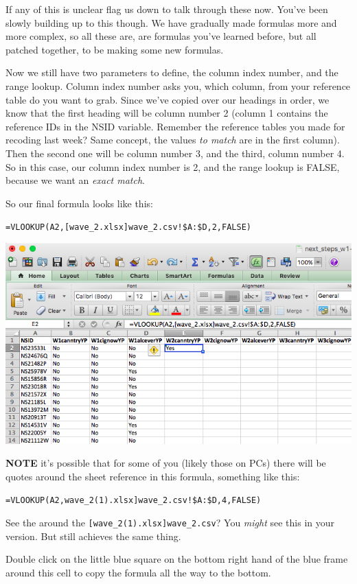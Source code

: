 \documentclass[
]{book}
\begin{document}
If any of this is unclear flag us down to talk through these now. You've been slowly building up to this though. We have gradually made formulas more and more complex, so all these are, are formulas you've learned before, but all patched together, to be making some new formulas.

Now we still have two parameters to define, the column index number, and the range lookup. Column index number asks you, which column, from your reference table do you want to grab. Since we've copied over our headings in order, we know that the first heading will be column number 2 (column 1 contains the reference IDs in the NSID variable. Remember the reference tables you made for recoding last week? Same concept, the values \emph{to match} are in the first column). Then the second one will be column number 3, and the third, column number 4. So in this case, our column index number is 2, and the range lookup is FALSE, because we want an \emph{exact match}.

So our final formula looks like this:

\texttt{=VLOOKUP(A2,{[}wave\_2.xlsx{]}wave\_2.csv!\$A:\$D,2,FALSE)}

\includegraphics{imgs/merge_first_form.png}

\textbf{NOTE} it's possible that for some of you (likely those on PCs) there will be quotes around the sheet reference in this formula, something like this:

\texttt{=VLOOKUP(A2,\textquotesingle{}{[}wave\_2(1).xlsx{]}wave\_2.csv\textquotesingle{}!\$A:\$D,4,FALSE)}

See the \texttt{\textquotesingle{}} around the \texttt{{[}wave\_2(1).xlsx{]}wave\_2.csv}? You \emph{might} see this in your version. But still achieves the same thing.

Double click on the little blue square on the bottom right hand of the blue frame around this cell to copy the formula all the way to the bottom.
\end{document}
